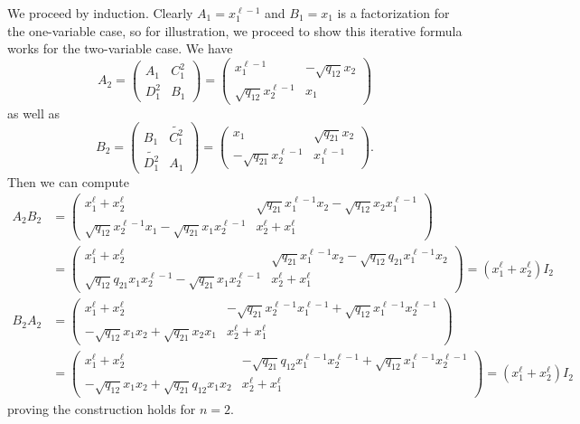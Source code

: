\documentclass [11pt, proquest] {uwthesis}[2020/02/24]
\begin{document}
    \begin{prf}
        We proceed by induction. Clearly $A_1=x_1^{\ell -1}$ and $B_1=x_1$ is a factorization for the one-variable case, so for illustration, we proceed to show this iterative formula works for the two-variable case. We have
        \[A_2=\begin{pmatrix}A_1 & C_1^2\\ D_1^2& B_1\end{pmatrix}=\begin{pmatrix}x_1^{\ell -1} & -\sqrt{q_{12}}x_2\\ \sqrt{q_{12}}x_2^{\ell -1} & x_1\end{pmatrix}\]
        as well as
        \[B_2=\begin{pmatrix}B_1 & \widetilde{C_1^2}\\\widetilde{D_1^2} & A_1\end{pmatrix}= \begin{pmatrix}x_1 & \sqrt{q_{21}}x_2\\ -\sqrt{q_{21}}x_2^{\ell -1} & x_1^{\ell -1}\end{pmatrix}.\]
        Then we can compute
        \begin{align*}
        A_2B_2&=\begin{pmatrix}x_1^\ell  + x_2^\ell  & \sqrt{q_{21}}x_1^{\ell -1}x_2 - \sqrt{q_{12}}x_2x_1^{\ell -1}\\
        \sqrt{q_{12}}x_2^{\ell -1}x_1 - \sqrt{q_{21}}x_1x_2^{\ell -1} & x_2^\ell +x_1^\ell \end{pmatrix}\\
        &=\begin{pmatrix}x_1^\ell  + x_2^\ell  & \sqrt{q_{21}}x_1^{\ell -1}x_2 - \sqrt{q_{12}}q_{21}x_1^{\ell -1}x_2\\
        \sqrt{q_{12}}q_{21}x_1x_2^{\ell -1} - \sqrt{q_{21}}x_1x_2^{\ell -1} & x_2^\ell +x_1^\ell \end{pmatrix}=(x_1^\ell+x_2^\ell)I_2
        \end{align*}
        \begin{align*}
        B_2A_2&=\begin{pmatrix}x_1^\ell  + x_2^\ell  & -\sqrt{q_{21}}x_2^{\ell -1}x_1^{\ell -1}+\sqrt{q_{12}}x_1^{\ell -1}x_2^{\ell -1}\\
        -\sqrt{q_{12}}x_1x_2 + \sqrt{q_{21}}x_2x_1 & x_2^\ell +x_1^\ell \end{pmatrix}\\
        &=\begin{pmatrix}x_1^\ell  + x_2^\ell  & -\sqrt{q_{21}}q_{12}x_1^{\ell -1}x_2^{\ell -1}+\sqrt{q_{12}}x_1^{\ell -1}x_2^{\ell -1}\\
        -\sqrt{q_{12}}x_1x_2 + \sqrt{q_{21}}q_{12}x_1x_2 & x_2^\ell +x_1^\ell \end{pmatrix}=(x_1^\ell+x_2^\ell)I_2
        \end{align*}
        proving the construction holds for $n=2$.
        

\end{prf}
\end{document}
